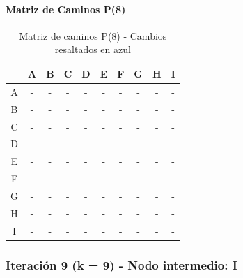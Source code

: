 \documentclass[12pt]{article}
\begin{document}
\paragraph{Matriz de Caminos P(8)}
\begin{table}[h!]
\centering
\begin{tabular}{|c|c|c|c|c|c|c|c|c|c|}
\hline
 & A & B & C & D & E & F & G & H & I \\\hline
A & - & - & - & - & - & - & - & - & - \\\hline
B & - & - & - & - & - & - & - & - & - \\\hline
C & - & - & - & - & - & - & - & - & - \\\hline
D & - & - & - & - & - & - & - & - & - \\\hline
E & - & - & - & - & - & - & - & - & - \\\hline
F & - & - & - & - & - & - & - & - & - \\\hline
G & - & - & - & - & - & - & - & - & - \\\hline
H & - & - & - & - & - & - & - & - & - \\\hline
I & - & - & - & - & - & - & - & - & - \\\hline
\end{tabular}
\caption{Matriz de caminos P(8) - Cambios resaltados en azul}
\end{table}

\subsubsection{Iteración 9 (k = 9) - Nodo intermedio: I}
\end{document}
